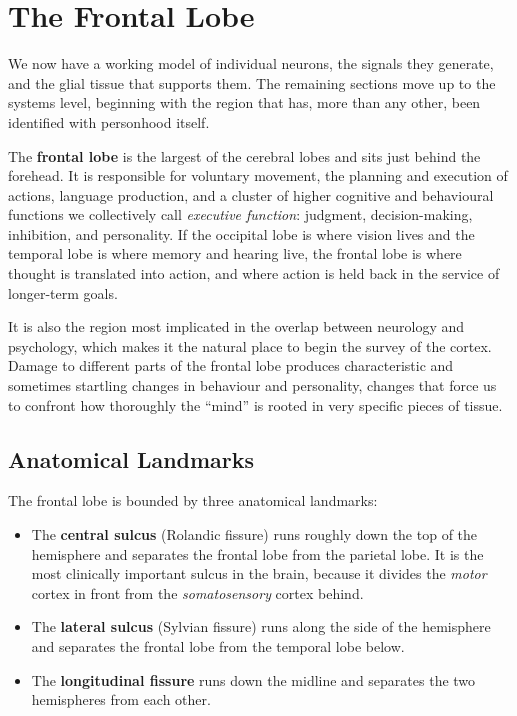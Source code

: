\documentclass[11pt]{article}
\begin{document}
\section{The Frontal Lobe}

We now have a working model of individual neurons, the signals they generate, and the glial tissue that supports them. The remaining sections move up to the systems level, beginning with the region that has, more than any other, been identified with personhood itself.

The \textbf{frontal lobe} is the largest of the cerebral lobes and sits just behind the forehead. It is responsible for voluntary movement, the planning and execution of actions, language production, and a cluster of higher cognitive and behavioural functions we collectively call \textit{executive function}: judgment, decision-making, inhibition, and personality. If the occipital lobe is where vision lives and the temporal lobe is where memory and hearing live, the frontal lobe is where thought is translated into action, and where action is held back in the service of longer-term goals.

It is also the region most implicated in the overlap between neurology and psychology, which makes it the natural place to begin the survey of the cortex. Damage to different parts of the frontal lobe produces characteristic and sometimes startling changes in behaviour and personality, changes that force us to confront how thoroughly the ``mind'' is rooted in very specific pieces of tissue.

\subsection{Anatomical Landmarks}

The frontal lobe is bounded by three anatomical landmarks:

\begin{itemize}
    \item The \textbf{central sulcus} (Rolandic fissure) runs roughly down the top of the hemisphere and separates the frontal lobe from the parietal lobe. It is the most clinically important sulcus in the brain, because it divides the \textit{motor} cortex in front from the \textit{somatosensory} cortex behind.
    \item The \textbf{lateral sulcus} (Sylvian fissure) runs along the side of the hemisphere and separates the frontal lobe from the temporal lobe below.
    \item The \textbf{longitudinal fissure} runs down the midline and separates the two hemispheres from each other.
\end{itemize}
\end{document}
